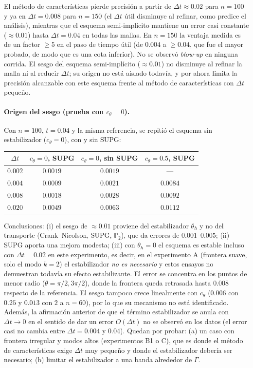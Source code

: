 El método de características pierde precisión a partir de $\Delta t\approx0.02$ para $n=100$ y ya en $\Delta t=0.008$ para $n=150$ (el $\Delta t$ útil disminuye al refinar, como predice el análisis), mientras que el esquema semi-implícito mantiene un error casi constante ($\approx0.01$) hasta $\Delta t=0.04$ en todas las mallas. En $n=150$ la ventaja medida es de un factor $\ge5$ en el paso de tiempo útil (de $0.004$ a $\ge0.04$, que fue el mayor probado, de modo que es una cota inferior). No se observó \emph{blow-up} en ninguna corrida. El sesgo del esquema semi-implícito ($\approx0.01$) no disminuye al refinar la malla ni al reducir $\Delta t$; su origen no está aislado todavía, y por ahora limita la precisión alcanzable con este esquema frente al método de características con $\Delta t$ pequeño.

\paragraph{Origen del sesgo (prueba con $c_\theta=0$).} Con $n=100$, $t=0.04$ y la misma referencia, se repitió el esquema sin estabilizador ($c_\theta=0$), con y sin SUPG:

\begin{center}
\begin{tabular}{cccc}
\toprule
$\Delta t$ & $c_\theta=0$, SUPG & $c_\theta=0$, sin SUPG & $c_\theta=0.5$, SUPG\\
\midrule
$0.002$ & $0.0019$ & $0.0019$ & ---\\
$0.004$ & $0.0009$ & $0.0021$ & $0.0084$\\
$0.008$ & $0.0018$ & $0.0028$ & $0.0092$\\
$0.020$ & $0.0049$ & $0.0063$ & $0.0112$\\
\bottomrule
\end{tabular}
\end{center}

Conclusiones: (i) el sesgo de $\approx0.01$ proviene del estabilizador $\theta_h$ y no del transporte (Crank--Nicolson, SUPG, $\mathbb{P}_2$), que da errores de $0.001$--$0.005$; (ii) SUPG aporta una mejora modesta; (iii) con $\theta_h=0$ el esquema es estable incluso con $\Delta t=0.02$ en este experimento, es decir, en el experimento A (frontera suave, solo el modo $k=2$) el estabilizador \emph{no es necesario} y estos ensayos no demuestran todavía su efecto estabilizante. El error se concentra en los puntos de menor radio ($\theta=\pi/2,3\pi/2$), donde la frontera queda retrasada hasta $0.008$ respecto de la referencia. El sesgo tampoco crece linealmente con $c_\theta$ ($0.006$ con $0.25$ y $0.013$ con $2$ a $n=60$), por lo que su mecanismo no está identificado. Además, la afirmación anterior de que el término estabilizador se anula con $\Delta t\to0$ en el sentido de dar un error $O(\Delta t)$ no se observó en los datos (el error casi no cambia entre $\Delta t=0.004$ y $0.04$). Quedan por probar: (a) un caso con frontera irregular y modos altos (experimentos B1 o C), que es donde el método de características exige $\Delta t$ muy pequeño y donde el estabilizador debería ser necesario; (b) limitar el estabilizador a una banda alrededor de $\Gamma$.

